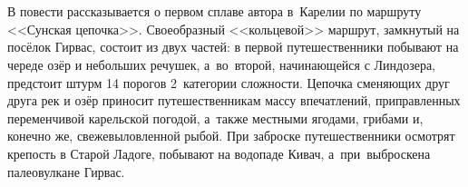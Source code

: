 \chapter*{}

В повести рассказывается о первом сплаве автора в~Карелии по маршруту <<Сунская цепочка>>\cite{Шилов}. Своеобразный <<кольцевой>> маршрут, замкнутый на посёлок Гирвас, состоит из двух частей: в первой путешественники побывают на череде озёр и небольших речушек, а~во~второй, начинающейся с Линдозера, предстоит штурм 14 порогов 2~категории сложности. Цепочка сменяющих друг друга рек и озёр приносит путешественникам массу впечатлений, приправленных переменчивой карельской погодой, а~также местными ягодами, грибами и, конечно же, свежевыловленной рыбой. При заброске путешественники осмотрят крепость в Старой Ладоге, побывают на водопаде Кивач, а~при~выброске\mdash на палеовулкане Гирвас.

